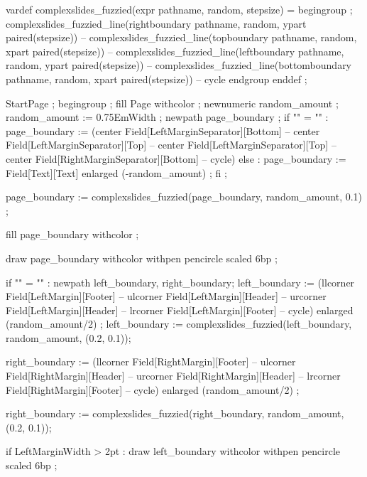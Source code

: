   vardef complexslides_fuzzied(expr pathname, random, stepsize) =
     begingroup ;
           complexslides_fuzzied_line(rightboundary  pathname, random, ypart paired(stepsize))
        -- complexslides_fuzzied_line(topboundary    pathname, random, xpart paired(stepsize))
        -- complexslides_fuzzied_line(leftboundary   pathname, random, ypart paired(stepsize))
        -- complexslides_fuzzied_line(bottomboundary pathname, random, xpart paired(stepsize))
        -- cycle
     endgroup
  enddef ;
\stopMPdefinitions

  StartPage ;
  begingroup ;
  fill Page withcolor  ;
  newnumeric random_amount ; random_amount := 0.75EmWidth ;
  newpath page_boundary ;
  if "\currentmakeup" = "" :
      page_boundary := (center Field[LeftMarginSeparator][Bottom]
                     -- center Field[LeftMarginSeparator][Top]
                     -- center Field[LeftMarginSeparator][Top]
                     -- center  Field[RightMarginSeparator][Bottom]
                     -- cycle)
  else :
      page_boundary := Field[Text][Text] enlarged (-random_amount) ;
  fi ;

  page_boundary := complexslides_fuzzied(page_boundary, random_amount, 0.1) ;

  fill page_boundary withcolor  ;

  draw page_boundary withcolor 
       withpen pencircle scaled 6bp ;

  if "\currentmakeup" = "" :
     newpath left_boundary, right_boundary;
      left_boundary := (llcorner Field[LeftMargin][Footer]
                     -- ulcorner Field[LeftMargin][Header]
                     -- urcorner Field[LeftMargin][Header]
                     -- lrcorner Field[LeftMargin][Footer]
                     -- cycle)
                     enlarged (random_amount/2) ;
      left_boundary  := complexslides_fuzzied(left_boundary, random_amount, (0.2, 0.1));

      right_boundary := (llcorner Field[RightMargin][Footer]
                      -- ulcorner Field[RightMargin][Header]
                      -- urcorner Field[RightMargin][Header]
                      -- lrcorner Field[RightMargin][Footer]
                      -- cycle)
                      enlarged (random_amount/2) ;

      right_boundary := complexslides_fuzzied(right_boundary, random_amount, (0.2, 0.1));

     if LeftMarginWidth > 2pt :
        draw left_boundary
           withcolor 
           withpen pencircle scaled 6bp ;

